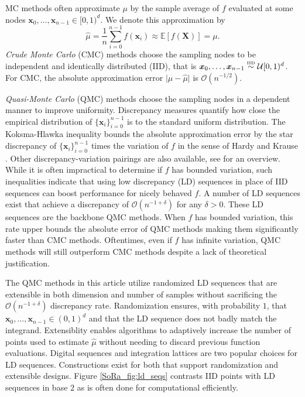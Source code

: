 \documentclass[graybox]{svmult}
\begin{document}
MC methods often approximate $\mu$ by the sample average of $f$ evaluated at some nodes $\boldsymbol{x}_0,\dots,\boldsymbol{x}_{n-1} \in [0,1)^d$. We denote this approximation by  
\begin{equation}
    \label{SoRa_eq:mcapprox}
    \hat{\mu} = \frac{1}{n}\sum_{i=0}^{n-1} f(\boldsymbol{x}_i) \approx \mathbb{E}[f(\boldsymbol{X})] = \mu. 
\end{equation}
\emph{Crude Monte Carlo} (CMC) methods choose the sampling nodes to be independent and identically distributed (IID), that is $\boldsymbol{x}_0,\dots,\boldsymbol{x}_{n-1} \overset{\text{\tiny IID}}{\sim} \mathcal{U}[0,1)^{d}$. For CMC, the absolute approximation error $\lvert \mu - \hat{\mu} \rvert$ is $\mathcal{O}(n^{-1/2})$. 

\emph{Quasi-Monte Carlo} (QMC) methods choose the sampling nodes in a dependent manner to improve uniformity. Discrepancy measures quantify how close the empirical distribution of $\{\boldsymbol{x}_i\}_{i=0}^{n-1}$ is to the standard uniform distribution. The Koksma-Hlawka inequality bounds the absolute approximation error by the star discrepancy of $\{\boldsymbol{x}_i\}_{i=0}^{n-1}$ times the variation of $f$ in the sense of Hardy and Krause \cite{dick2013high}. Other discrepancy-variation pairings are also available, see \cite{hickernell1998generalized} for an overview. While it is often impractical to determine if $f$ has bounded variation, such inequalities indicate that using low discrepancy (LD) sequences in place of IID sequences can boost performance for nicely behaved $f$. A number of LD sequences exist that achieve a discrepancy of $\mathcal{O}(n^{-1+\delta})$ for any $\delta > 0$. These LD sequences are the backbone QMC methods. When $f$ has bounded variation, this rate upper bounds the absolute error of QMC methods making them significantly faster than CMC methods. Oftentimes, even if $f$ has infinite variation, QMC methods will still outperform CMC methods despite a lack of theoretical justification. 

The QMC methods in this article utilize randomized LD sequences that are extensible in both dimension and number of samples without sacrificing the $\mathcal{O}(n^{-1+\delta})$ discrepancy rate. Randomization ensures, with probability $1$, that $\boldsymbol{x}_0,\dots,\boldsymbol{x}_{n-1} \in (0,1)^d$ and that the LD sequence does not badly match the integrand. Extensiblity enables algorithms to adaptively increase the number of points used to estimate $\hat{\mu}$ without needing to discard previous function evaluations. Digital sequences and integration lattices are two popular choices for LD sequences. Constructions exist for both that support randomization and extensible designs. Figure \ref{SoRa_fig:ld_seqs} contrasts IID points with LD sequences in base $2$ as is often done for computational efficiently.
\end{document}
